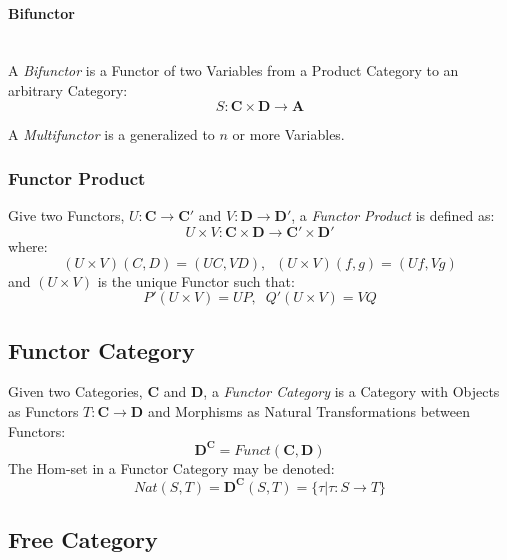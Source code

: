 \paragraph{Bifunctor}\label{subsec:bifunctor}
\hfill \\

A \emph{Bifunctor} is a Functor of two Variables from a Product
Category to an arbitrary Category:
\[
    S : \mathbf{C} \times \mathbf{D} \rightarrow \mathbf{A}
\]

A \emph{Multifunctor} is a generalized to $n$ or more Variables.



\subsubsection{Functor Product}\label{subsec:functor_product}

Give two Functors, $U : \mathbf{C} \rightarrow \mathbf{C'}$ and $V :
\mathbf{D} \rightarrow \mathbf{D'}$, a \emph{Functor Product} is
defined as:
\[
    U \times V : \mathbf{C} \times \mathbf{D}
    \rightarrow \mathbf{C'} \times \mathbf{D'}
\]
where:
\[
    (U \times V)(C,D) = (UC,VD), \;\; (U \times V)(f,g) = (Uf,Vg)
\]
and $(U \times V)$ is the unique Functor such that:
\[
    P'(U \times V) = UP, \;\; Q'(U \times V) = VQ
\]



\subsection{Functor Category}\label{subsec:functor_category}

Given two Categories, $\mathbf{C}$ and $\mathbf{D}$, a \emph{Functor
  Category} is a Category with Objects as Functors $T : \mathbf{C}
\rightarrow \mathbf{D}$ and Morphisms as Natural Transformations
between Functors:
\[
    \mathbf{D}^{\mathbf{C}} = Funct(\mathbf{C},\mathbf{D})
\]
The Hom-set in a Functor Category may be denoted:
\[
    Nat(S,T) = \mathbf{D}^{\mathbf{C}}(S,T) =
        \{ \tau | \tau : S \rightarrow T \}
\]



\subsection{Free Category}\label{subsec:free_category}

